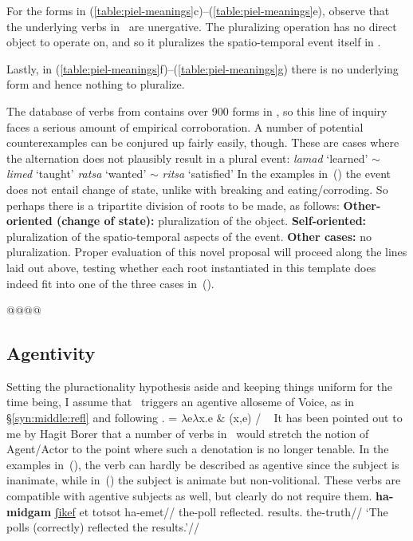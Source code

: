 For the forms in (\ref{table:piel-meanings}c)--(\ref{table:piel-meanings}e), observe that the underlying verbs in \tkal~are unergative. The pluralizing operation has no direct object to operate on, and so it pluralizes the spatio-temporal event itself in \tpie.

Lastly, in (\ref{table:piel-meanings}f)--(\ref{table:piel-meanings}g) there is no underlying form and hence nothing to pluralize.

The database of verbs from \cite{ehrenfeld12} contains over 900 forms in \tpie, so this line of inquiry faces a serious amount of empirical corroboration. A number of potential counterexamples can be conjured up fairly easily, though. These are cases where the alternation does not plausibly result in a plural event:
\pex
	\a \emph{lamad} `learned' $\sim$ \emph{limed} `taught'
	\a \emph{ratsa} `wanted' $\sim$ \emph{ritsa} `satisfied'
\xe
In the examples in~(\lastx) the event does not entail change of state, unlike with breaking and eating/corroding. So perhaps there is a tripartite division of roots to be made, as follows:
\pex
	\a \textbf{Other-oriented (change of state):} pluralization of the object.
	\a \textbf{Self-oriented:} pluralization of the spatio-temporal aspects of the event.
	\a \textbf{Other cases:} no pluralization.
\xe
Proper evaluation of this novel proposal will proceed along the lines laid out above, testing whether each root instantiated in this template does indeed fit into one of the three cases in~(\lastx).

@@\cite{greenberg10}@@


	\subsection{Agentivity} \label{voice:va:agent}
Setting the pluractionality hypothesis aside and keeping things uniform for the time being, I assume that \va~triggers an agentive alloseme of Voice, as in \S\ref{syn:middle:refl} and following \cite{doron03,doron14adj}.
\ex {} = $\lambda$e$\lambda$x.e \& (x,e) / \trace~\va
\xe
It has been pointed out to me by Hagit Borer that a number of verbs in \tpie~would stretch the notion of Agent/Actor to the point where such a denotation is no longer tenable. In the examples in~(\nextx), the verb can hardly be described as agentive since the subject is inanimate, while in~(\anextx) the subject is animate but non-volitional. These verbs are compatible with agentive subjects as well, but clearly do not require them.
\pex
  \a \begingl
    \gla \textbf{ha-midgam} \underline{ʃikef} et totsot ha-emet//
    \glb the-poll reflected.  results. the-truth//
    \glft `The polls (correctly) reflected the results.'//
  \endgl
    
